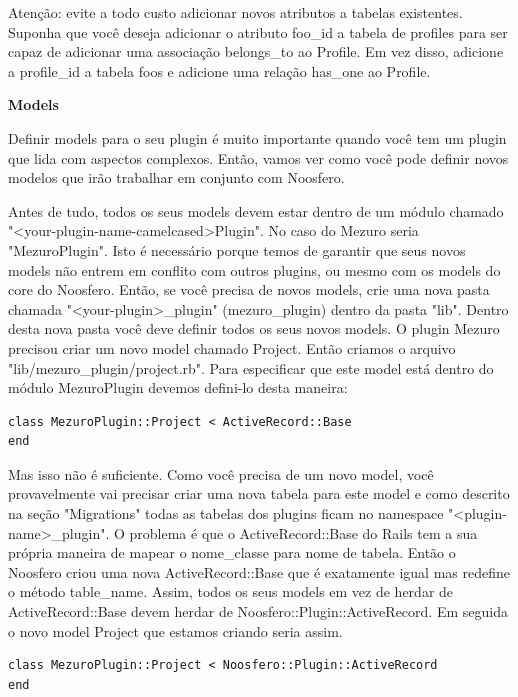 \documentclass[11pt]{article}
\begin{document}
Atenção: evite a todo custo adicionar novos atributos a tabelas existentes.
Suponha que você deseja adicionar o atributo foo\_id a tabela de profiles para
ser capaz de adicionar uma associação belongs\_to ao Profile. Em vez disso,
adicione a profile\_id a tabela foos e adicione uma relação has\_one ao Profile.

{\bf Models}

Definir models para o seu plugin é muito importante quando você tem um plugin
que lida com aspectos complexos. Então, vamos ver como você pode definir novos
modelos que irão trabalhar em conjunto com Noosfero.

Antes de tudo, todos os seus models devem estar dentro de um módulo
chamado "<your-plugin-name-camelcased>Plugin". No caso do Mezuro seria
"MezuroPlugin". Isto é necessário porque temos de garantir que seus novos
models não entrem em conflito com outros plugins, ou mesmo com os models do
core do Noosfero. Então, se você precisa de novos models, crie uma nova pasta
chamada "<your-plugin>\_plugin" (mezuro\_plugin) dentro da pasta "lib". Dentro
desta nova pasta você deve definir todos os seus novos models. O plugin Mezuro
precisou criar um novo model chamado Project. Então criamos o arquivo
"lib/mezuro\_plugin/project.rb". Para especificar que este model está dentro do
módulo MezuroPlugin devemos defini-lo desta maneira:

\begin{Verbatim}[frame=single,fontfamily=courier]
class MezuroPlugin::Project < ActiveRecord::Base
end
\end{Verbatim}

Mas isso não é suficiente. Como você precisa de um novo model, você
provavelmente vai precisar criar uma nova tabela para este model e como
descrito na seção "Migrations" todas as tabelas dos plugins ficam no namespace
"<plugin-name>\_plugin". O problema é que o ActiveRecord::Base do Rails tem a
sua própria maneira de mapear o nome\_classe para nome de tabela. Então o
Noosfero criou uma nova ActiveRecord::Base que é exatamente igual mas redefine
o método table\_name. Assim, todos os seus models em vez de herdar de
ActiveRecord::Base devem herdar de Noosfero::Plugin::ActiveRecord. Em seguida
o novo model Project que estamos criando seria assim.

\begin{Verbatim}[frame=single,fontfamily=courier]
class MezuroPlugin::Project < Noosfero::Plugin::ActiveRecord
end
\end{Verbatim}
\end{document}
